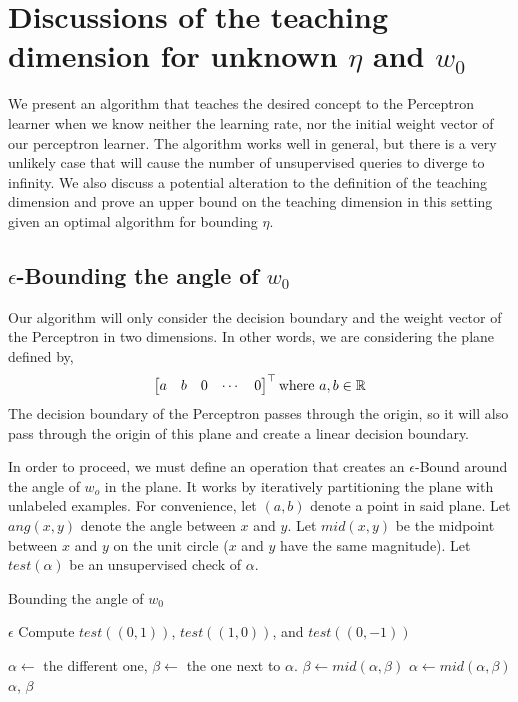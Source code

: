 \documentclass{article}
\begin{document}
\section{Discussions of the teaching dimension for unknown $\eta$ and $w_0$}

We present an algorithm that teaches the desired concept to the Perceptron
learner when we know neither the learning rate, nor the initial weight vector of
our perceptron learner. The algorithm works well in general, but there is a very
unlikely case that will cause the number of unsupervised queries to diverge to
infinity. We also discuss a potential alteration to the definition of the teaching
dimension and prove an upper bound on the teaching dimension in this setting
given an optimal algorithm for bounding $\eta$.

\subsection{$\epsilon$-Bounding the angle of $w_0$}
Our algorithm will only consider the decision boundary and the weight vector of
the Perceptron in two dimensions. In other words, we are considering the plane defined by,
\[
  \begin{bmatrix}
    a & b & 0 & \cdots & 0
  \end{bmatrix} ^ \top
  \textnormal{where}
  \ a, b \in \mathbb{R}
\]
The decision boundary of the Perceptron passes through the origin, so it will
also pass through the origin of this plane and create a linear decision
boundary.

In order to proceed, we must define an operation that creates an
$\epsilon$-Bound around the angle of $w_o$ in the plane. It works by iteratively
partitioning the plane with unlabeled examples. For convenience, let $(a,b)$
denote a point in said plane. Let $ang(x,y)$ denote the angle between $x$ and
$y$. Let $mid(x, y)$ be the midpoint between $x$ and $y$ on the unit circle
($x$ and $y$ have the same magnitude). Let $test(\alpha)$ be an unsupervised
check of $\alpha$.

\begin{algorithm}
\caption{Bounding the angle of $w_0$}
\begin{algorithmic}[1]
	\REQUIRE $\epsilon$
  \STATE Compute $test((0,1))$, $test((1,0))$, and $test((0,-1))$

  \STATE $\alpha \leftarrow $ the different one, $\beta \leftarrow $ the one
  next to $\alpha$.
  \STATE $\beta \leftarrow mid(\alpha, \beta)$
  \ELSE
  \STATE $\alpha \leftarrow mid(\alpha, \beta)$
  \ENDIF
  \ENDFOR
  \RETURN $\alpha$, $\beta$
  
\end{algorithmic}
\end{algorithm}
\end{document}
